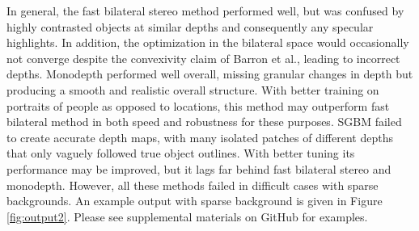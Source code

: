 \documentclass[10pt,twocolumn,letterpaper]{article}
\begin{document}
\par In general, the fast bilateral stereo method performed well, but was confused by highly contrasted objects at similar depths and consequently any specular highlights.
In addition, the optimization in the bilateral space would occasionally not converge despite the convexivity claim of Barron et al., leading to incorrect depths.
Monodepth performed well overall, missing granular changes in depth but producing a smooth and realistic overall structure. With better training on portraits of people
as opposed to locations, this method may outperform fast bilateral method in both speed and robustness for these purposes. SGBM failed to create accurate depth maps,
with many isolated patches of different depths that only vaguely followed true object outlines. With better tuning its performance may be improved, but it lags far
behind fast bilateral stereo and monodepth. However, all these methods failed in difficult cases with sparse backgrounds. An example output with sparse background is given
in Figure \ref{fig:output2}. Please see supplemental materials on GitHub for examples.
\end{document}
